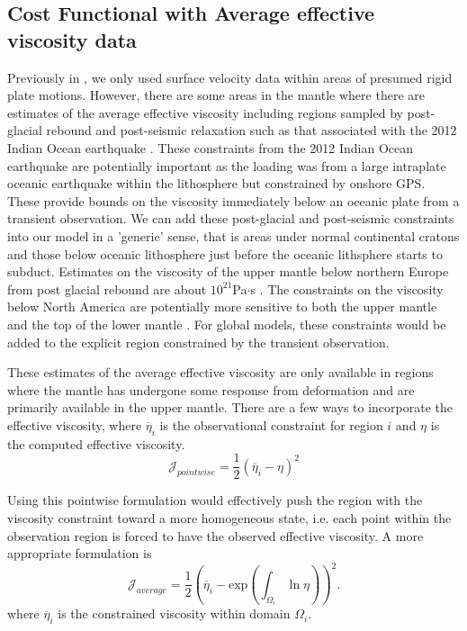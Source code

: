 \documentclass[12pt]{article}
\begin{document}
\subsection*{Cost Functional with Average effective viscosity data}

Previously in \citep{ratnaswamy2015adjoint}, we only used surface velocity data within areas of presumed rigid plate motions. 
However, there are some areas in the mantle where there are estimates of the average effective viscosity including regions sampled by post-glacial rebound and post-seismic relaxation such as that associated with the 2012 Indian Ocean earthquake \citep{hu2016asthenosphere}.  
These constraints from the 2012 Indian Ocean earthquake are potentially important as the loading was from a large intraplate oceanic earthquake within the lithosphere but constrained by onshore GPS. These provide bounds on the viscosity immediately below an oceanic plate from a transient observation. We can add these post-glacial and post-seismic constraints into our model in a 'generic' sense, that is areas under normal continental cratons and those below oceanic lithosphere just before the oceanic lithsphere starts to subduct. Estimates on the viscosity of the upper mantle below northern Europe from post glacial rebound are about $10^{21}$Pa$\cdot$s \citep{hu2016asthenosphere}. The constraints on the viscosity below North America are potentially more sensitive to both the upper mantle and the top of the lower mantle \citep{mitrovica1995constraints,simons1997localization}. For global models, these constraints would be added to the explicit region constrained by the transient observation.

These estimates of the average effective viscosity are only available in regions where the mantle has undergone some response from deformation and are primarily available in the upper mantle.   There are a few ways to incorporate the effective viscosity, where $\overline{\eta}_i$ is the observational constraint for region $i$ and $\eta$ is the computed effective viscosity.
\begin{equation}
   \mathcal{J}_{pointwise}=  \frac{1}{2}(\overline{\eta}_i - \eta)^{2}
\label{eq:pointwise}
\end{equation}

Using this pointwise formulation would effectively push the region with the viscosity constraint toward a more homogeneous state, i.e. each point within the observation region is forced to have the observed effective viscosity. A more appropriate formulation is
\begin{equation}
 \mathcal{J}_{average}=\frac{1}{2}(\overline{\eta}_i - \text{exp}({\int_{\Omega_i} \ln \eta}))^{2}.
\end{equation}
where $\overline{\eta}_i$ is the constrained viscosity within domain $\Omega_i$.
\end{document}
